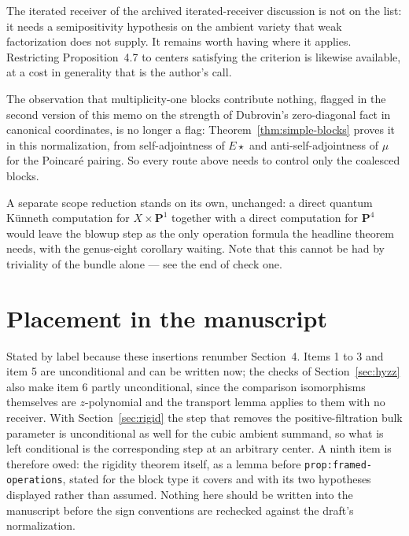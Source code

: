\documentclass[11pt]{article}
\theoremstyle{definition}
\theoremstyle{remark}
\newcommand{\PP}{\mathbf P}
\begin{document}
The iterated receiver of the archived iterated-receiver discussion is not on the list: it needs
a semipositivity hypothesis on the ambient variety that weak factorization does
not supply. It remains worth having where it applies. Restricting
Proposition~4.7 to centers satisfying the criterion is likewise available, at a
cost in generality that is the author's call.

The observation that multiplicity-one blocks contribute nothing, flagged in the
second version of this memo on the strength of Dubrovin's zero-diagonal fact in
canonical coordinates, is no longer a flag: Theorem~\ref{thm:simple-blocks}
proves it in this normalization, from self-adjointness of $E\star$ and
anti-self-adjointness of $\mu$ for the Poincar\'e pairing. So every route above
needs to control only the coalesced blocks.

A separate scope reduction stands on its own, unchanged: a direct quantum
K\"unneth computation for $X\times\PP^1$ together with a direct computation for
$\PP^4$ would leave the blowup step as the only operation formula the headline
theorem needs, with the genus-eight corollary waiting. Note that this cannot be
had by triviality of the bundle alone --- see the end of check one.

\section{Placement in the manuscript}
\label{sec:placement}

Stated by label because these insertions renumber Section~4. Items 1 to 3 and
item 5 are unconditional and can be written now; the checks of
Section~\ref{sec:hyzz} also make item 6 partly unconditional, since the
comparison isomorphisms themselves are $z$-polynomial and the transport lemma
applies to them with no receiver. With Section~\ref{sec:rigid} the step that
removes the positive-filtration bulk parameter is unconditional as well for the
cubic ambient summand, so what is left conditional is the corresponding step at
an arbitrary center. A ninth item is therefore owed: the rigidity theorem
itself, as a lemma before \texttt{prop:framed-operations}, stated for the block
type it covers and with its two hypotheses displayed rather than assumed.
Nothing here should be written into the manuscript before the sign conventions
are rechecked against the draft's normalization.
\end{document}
